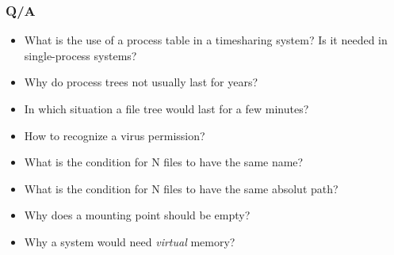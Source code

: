   \begin{frame}
    \frametitle{Q/A}
    \begin{itemize}
      \item What is the use of a process table in a timesharing system? Is it needed in single-process systems? %
      \item Why do process trees not usually last for years? %
      \item In which situation a file tree would last for a few minutes? %
      \item How to recognize a virus permission? %
      \item What is the condition for N files to have the same name? %
      \item What is the condition for N files to have the same absolut path? %
      \item Why does a mounting point should be empty? %
      \item Why a system would need \emph{virtual} memory? %
    \end{itemize}
  \end{frame}
